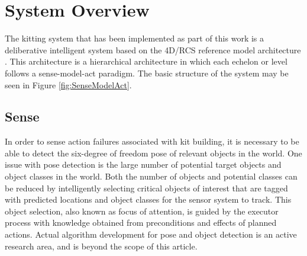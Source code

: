 \section{System Overview}
\label{sect:overview}
The kitting system that has been implemented as part of this work is a deliberative intelligent system based on the 4D/RCS 
reference model architecture \cite{Albus2000}. This architecture is a hierarchical architecture in which each echelon or level
follows a sense-model-act paradigm. The basic structure of the system may be seen in Figure \ref{fig:SenseModelAct}.
%
\subsection{Sense}
\label{subsection:Sense}
In order to sense action failures associated with kit building, it is necessary to be able to detect the six-degree of freedom pose of relevant objects in the
world. One issue with pose detection is the large number of potential target objects and object classes in the world. 
Both the number of objects and potential classes can be reduced by intelligently
selecting critical objects of interest that are tagged with predicted locations and object classes for the sensor system to track. This object selection, 
also known as focus of attention, is guided by
the executor process with knowledge obtained from preconditions and effects of planned actions.
Actual algorithm development for pose and object detection is an active research area, and is beyond the scope of this article. 

